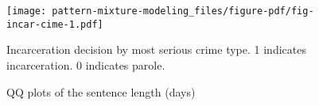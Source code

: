 \documentclass[
  letterpaper,
  DIV=11,
  numbers=noendperiod]{scrartcl}
\begin{document}
\begin{figure}

{\centering \texttt{[image: pattern-mixture-modeling\_files/figure-pdf/fig-incar-cime-1.pdf]}

}

\caption{\label{fig-incar-cime}Incarceration decision by most serious
crime type. 1 indicates incarceration. 0 indicates parole.}

\end{figure}

\begin{figure}

\begin{minipage}[t]{0.50\linewidth}

{\centering 


}

\end{minipage}%
%
\begin{minipage}[t]{0.50\linewidth}

{\centering 


}

\end{minipage}%

\caption{\label{fig-sen-len-qq}QQ plots of the sentence length (days)}

\end{figure}
\end{document}
